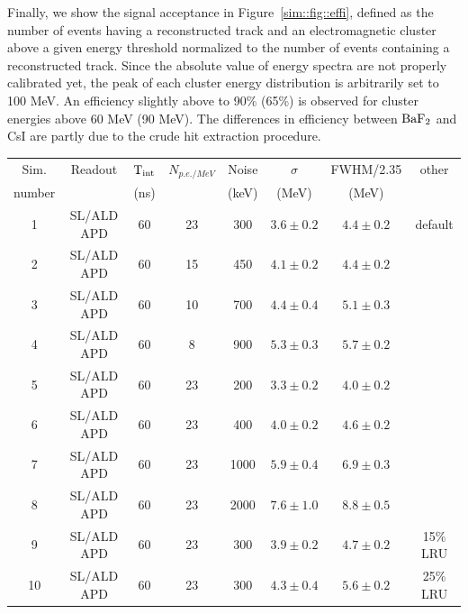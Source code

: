 Finally, we show the signal acceptance in Figure~\ref{sim::fig::effi}, defined as the number of events having a reconstructed track and an electromagnetic 
cluster above a given energy threshold normalized to the number of events containing a reconstructed track. Since the absolute value of energy spectra are 
not properly calibrated yet, the peak of each cluster energy distribution is arbitrarily set to 100 MeV. An efficiency slightly above to 90\% (65\%) is 
observed for cluster energies above 60 MeV (90 MeV). The differences in efficiency between $\rm BaF_2$ and CsI are partly due to the crude hit extraction 
procedure.

\begin{table}[htb]
\begin{center}
\begin{tabular}{|c|c|c|c|c|c|c|c|}\hline
Sim.       & Readout      & $\rm T_{int}$ & $N_{p.e./ MeV}$ & Noise   & $\sigma$  & FWHM/2.35 & other \\
number     &              & (ns)          &                 & (keV)   &  (MeV)    & (MeV)     & \\\hline         
1          & SL/ALD APD   & 60            & 23              & 300     & $ 3.6 \pm 0.2 $  & $ 4.4 \pm 0.2 $ &default\\
2          & SL/ALD APD   & 60            & 15              & 450     & $ 4.1 \pm 0.2 $  & $ 4.4 \pm 0.2 $ &\\
3          & SL/ALD APD   & 60            & 10              & 700     & $ 4.4 \pm 0.4 $  & $ 5.1 \pm 0.3 $ &\\
4          & SL/ALD APD   & 60            &  8              & 900     & $ 5.3 \pm 0.3 $  & $ 5.7 \pm 0.2 $ &\\
5          & SL/ALD APD   & 60            & 23              & 200     & $ 3.3 \pm 0.2 $  & $ 4.0 \pm 0.2 $ &\\
6          & SL/ALD APD   & 60            & 23              & 400     & $ 4.0 \pm 0.2 $  & $ 4.6 \pm 0.2 $ &\\
7          & SL/ALD APD   & 60            & 23              &1000     & $ 5.9 \pm 0.4 $  & $ 6.9 \pm 0.3 $ & \\ 
8          & SL/ALD APD   & 60            & 23              &2000     & $ 7.6 \pm 1.0 $  & $ 8.8 \pm 0.5 $ &\\ 
9          & SL/ALD APD   & 60            & 23              & 300     & $ 3.9 \pm 0.2 $  & $ 4.7 \pm 0.2 $ & 15\% LRU\\
10         & SL/ALD APD   & 60            & 23              & 300     & $ 4.3 \pm 0.4 $  & $ 5.6 \pm 0.2 $ & 25\% LRU\\

\end{tabular}
\end{center}
\end{table}
